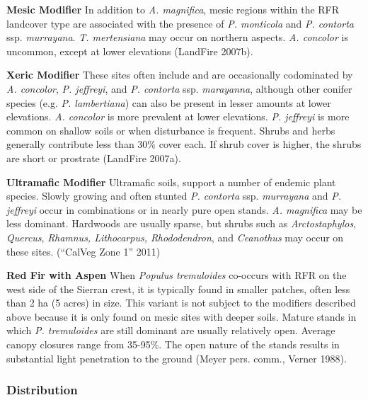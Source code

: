 \begin{adjustwidth}{2cm}{}
\noindent \textbf{Mesic Modifier } In addition to \emph{A. magnifica}, mesic regions within the RFR landcover type are associated with the presence of \emph{P. monticola} and \emph{P. contorta} ssp. \emph{murrayana}. \emph{T. mertensiana} may occur on northern aspects. \emph{A. concolor} is uncommon, except at lower elevations (LandFire 2007b).

\medskip
\noindent \textbf{Xeric Modifier}  These sites often include and are occasionally codominated by \emph{A. concolor}, \emph{P. jeffreyi}, and \emph{P. contorta} ssp. \emph{marayanna}, although other conifer species (e.g. \emph{P. lambertiana}) can also be present in lesser amounts at lower elevations. \emph{A. concolor} is more prevalent at lower elevations. \emph{P. jeffreyi} is more common on shallow soils or when disturbance is frequent. Shrubs and herbs generally contribute less than 30\% cover each. If shrub cover is higher, the shrubs are short or prostrate (LandFire 2007a).

\medskip
\noindent \textbf{Ultramafic Modifier} Ultramafic soils, support a number of endemic plant species. Slowly growing and often stunted \emph{P. contorta} ssp. \emph{murrayana} and \emph{P. jeffreyi} occur in combinations or in nearly pure open stands. \emph{A. magnifica} may be less dominant. Hardwoods are usually sparse, but shrubs such as \emph{Arctostaphylos}, \emph{Quercus}, \emph{Rhamnus, Lithocarpus, Rhododendron}, and \emph{Ceanothus} may occur on these sites. (``CalVeg Zone 1'' 2011)

\end{adjustwidth}

\noindent \textbf{Red Fir with Aspen} When \emph{Populus tremuloides} co-occurs with RFR on the west side of the Sierran crest, it is typically found in smaller patches, often less than 2 ha (5 acres) in size. This variant is not subject to the modifiers described above because it is only found on mesic sites with deeper soils. Mature stands in which \emph{P. tremuloides} are still dominant are usually relatively open. Average canopy closures range from 35-95\%. The open nature of the stands results in substantial light penetration to the ground (Meyer pers. comm., Verner 1988).



\subsubsection{Distribution}

